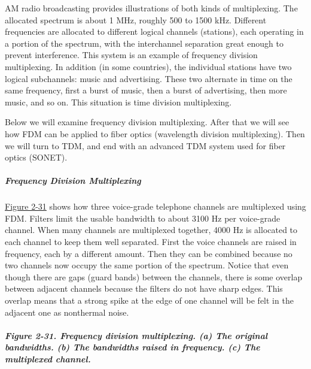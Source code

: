 \documentclass[b5paper,11pt]{memoir}
\begin{document}
AM radio broadcasting provides illustrations of both kinds of
multiplexing. The allocated spectrum is about 1 MHz, roughly 500 to 1500
kHz. Different frequencies are allocated to different logical channels
(stations), each operating in a portion of the spectrum, with the
interchannel separation great enough to prevent interference. This
system is an example of frequency division multiplexing. In addition (in
some countries), the individual stations have two logical subchannels:
music and advertising. These two alternate in time on the same
frequency, first a burst of music, then a burst of advertising, then
more music, and so on. This situation is time division multiplexing.

Below we will examine frequency division multiplexing. After that we
will see how FDM can be applied to fiber optics (wavelength division
multiplexing). Then we will turn to TDM, and end with an advanced TDM
system used for fiber optics (SONET).

\protect\hypertarget{0130661023_ch02lev1sec5.htmlux5cux23ch02lev3sec12}{}{}

\subparagraph{Frequency Division Multiplexing}

\protect\hyperlink{0130661023_ch02lev1sec5.htmlux5cux23ch02fig31}{Figure
2-31} shows how three voice-grade telephone channels are multiplexed
using FDM. Filters limit the usable bandwidth to about 3100 Hz per
voice-grade channel. When many channels are multiplexed together, 4000
Hz is allocated to each channel to keep them well separated. First the
voice channels are raised in frequency, each by a different amount. Then
they can be combined because no two channels now occupy the same portion
of the spectrum. Notice that even though there are gaps (guard bands)
between the channels, there is some overlap between adjacent channels
because the filters do not have sharp edges. This overlap means that a
strong spike at the edge of one channel will be felt in the adjacent one
as nonthermal noise.

\subparagraph[Figure 2-31. Frequency division multiplexing. (a) The
original bandwidths. (b) The bandwidths raised in frequency. (c) The
multiplexed
channel.]{\texorpdfstring{\protect\hypertarget{0130661023_ch02lev1sec5.htmlux5cux23ch02fig31}{}{}Figure
2-31. Frequency division multiplexing. (a) The original bandwidths. (b)
The bandwidths raised in frequency. (c) The multiplexed
channel.}{Figure 2-31. Frequency division multiplexing. (a) The original bandwidths. (b) The bandwidths raised in frequency. (c) The multiplexed channel.}}
\end{document}

